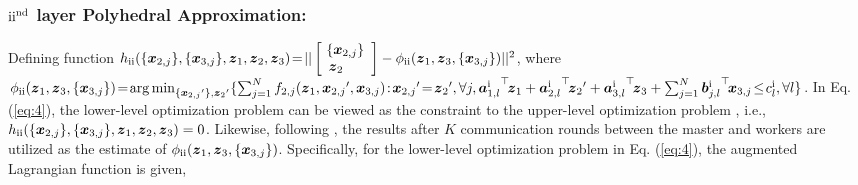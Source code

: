 \documentclass[letterpaper]{article} %
\begin{document}
\subsubsection{${\rm{\uppercase\expandafter{\romannumeral2}}}^{\rm{nd}}$ layer Polyhedral Approximation:}
Defining function $h_{{\rm{\uppercase\expandafter{\romannumeral2}}}}(\{{\boldsymbol{x}_{2,j}}\} ,\{ {\boldsymbol{x}_{3,j}}\} ,{\boldsymbol{z}_1},{\boldsymbol{z}_2},{\boldsymbol{z}_3}) \!= \!||\left[ \begin{array}{l}
     \!\{{\boldsymbol{x}_{2,j}}\} \\
     \boldsymbol{z}_2
\end{array} \right]  -\phi_{{\rm{\uppercase\expandafter{\romannumeral2}}}}({\boldsymbol{z}_1}, {\boldsymbol{z}_3}, \{{\boldsymbol{x}_{3,j}}\})||^2 $, where $\phi_{{\rm{\uppercase\expandafter{\romannumeral2}}}}({\boldsymbol{z}_1}, {\boldsymbol{z}_3}, \{{\boldsymbol{x}_{3,j}}\})\!=\! \mathop {\arg \min }\nolimits_{\{ {\boldsymbol{x}_{2,j}}'\} ,{\boldsymbol{z}_2}'} \{ \sum\nolimits_{j = 1}^N {{f_{2,j}}({\boldsymbol{z}_1},{\boldsymbol{x}_{2,j}}',{\boldsymbol{x}_{3,j}})}\!:\! {\boldsymbol{x}_{2,j}}' \!=\! {\boldsymbol{z}_2}', \forall j,  {\boldsymbol{a}_{1,l}^{\rm{\uppercase\expandafter{\romannumeral1}}}}^{\top}\!{\boldsymbol{z}_1} + {\boldsymbol{a}_{2,l}^{\rm{\uppercase\expandafter{\romannumeral1}}}}^{\top}\!{\boldsymbol{z}_2}' + {\boldsymbol{a}_{3,l}^{\rm{\uppercase\expandafter{\romannumeral1}}}}^{\top}\!{\boldsymbol{z}_3} + \sum\nolimits_{j = 1}^N {\boldsymbol{b}{{_{j,l}^{\rm{\uppercase\expandafter{\romannumeral1}}}}}}^{\top}\!{\boldsymbol{x}_{3,j}}  \!\le\! c_l^{\rm{\uppercase\expandafter{\romannumeral1}}},\forall l \}$.
In Eq. (\ref{eq:4}), the lower-level optimization problem can be viewed as the constraint to the upper-level optimization problem \cite{sinha2017review,gould2016differentiating}, i.e., $h_{{\rm{\uppercase\expandafter{\romannumeral2}}}}(\{{\boldsymbol{x}_{2,j}}\} ,\{ {\boldsymbol{x}_{3,j}}\} ,{\boldsymbol{z}_1},{\boldsymbol{z}_2},{\boldsymbol{z}_3}) =0$.  Likewise, following \cite{jiao2022asynchronous},  the results after $K$ communication rounds between the master and workers are utilized as the estimate of $\phi_{{\rm{\uppercase\expandafter{\romannumeral2}}}}({\boldsymbol{z}_1}, {\boldsymbol{z}_3}, \{{\boldsymbol{x}_{3,j}}\})$. Specifically, for the lower-level optimization problem in Eq. (\ref{eq:4}), the augmented Lagrangian function is given,
\end{document}
